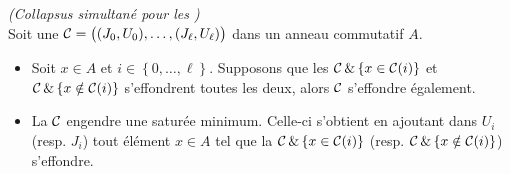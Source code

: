 \begin{theorem} 
\label{ThColSimKrA}{\em (Collapsus simultané pour les \procs)}\\
Soit une  \proc ${\cal C}=\big((J_0,U_0),\ldots,(J_\ell,U_\ell)\big)$ dans un anneau commutatif $A$. 
\begin{itemize}
\item [$(1)$] Soit $x\in A$ et $i\in\left\{0,\ldots ,\ell\right\}$.
Supposons que les \procs 
${\cal C}\,\&\left\{{x\in {\cal C}(i)}\right\} $
et 
${\cal C}\,\&\left\{{x\notin {\cal C}(i)}\right\} $
s'effondrent toutes les deux, alors ${\cal C}$ s'effondre également.
\item [$(2)$] La \proc ${\cal C}$ engendre une \proc saturée minimum.
Celle-ci s'obtient en ajoutant dans 
$U_i$ (resp. $J_i$) tout élément $x\in A$  tel que la \proc
${\cal C}\,\&\left\{{x\in {\cal C}(i)}\right\} $
(resp. ${\cal C}\,\&\left\{{x\notin {\cal C}(i)}\right\} $) 
s'effondre. 
\end{itemize}
\end{theorem}
